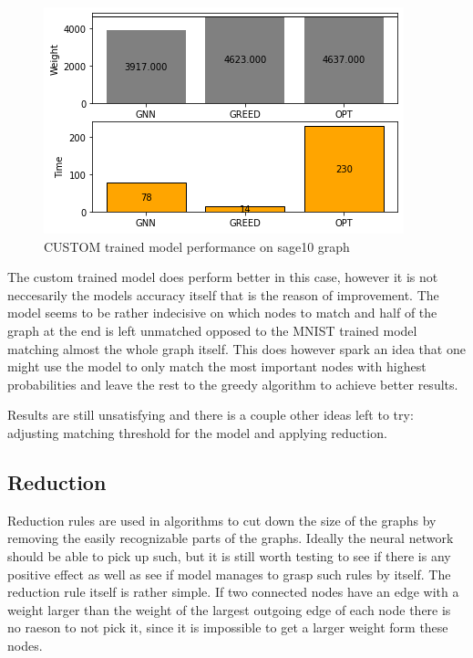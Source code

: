 \begin{figure}[H]
    \centering
    \includegraphics[scale=1.0]{figures/CUSTOMtrainSAGE10}
    \caption{CUSTOM trained model performance on sage10 graph}
    \label{model performance}
\end{figure}

The custom trained model does perform better in this case, however it is not neccesarily the models accuracy itself that is the reason of improvement. The model seems to be rather indecisive on which nodes to match and half of the graph at the end is left unmatched opposed to the MNIST trained model matching almost the whole graph itself. This does however spark an idea that one might use the model to only match the most important nodes with highest probabilities and leave the rest to the greedy algorithm to achieve better results. 

Results are still unsatisfying and there is a couple other ideas left to try: adjusting matching threshold for the model and applying reduction.

\subsection{Reduction}

Reduction rules are used in algorithms to cut down the size of the graphs by removing the easily recognizable parts of the graphs. Ideally the neural network should be able to pick up such, but it is still worth testing to see if there is any positive effect as well as see if model manages to grasp such rules by itself. The reduction rule itself is rather simple. If two connected nodes have an edge with a weight larger than the weight of the largest outgoing edge of each node there is no raeson to not pick it, since it is impossible to get a larger weight form these nodes.

